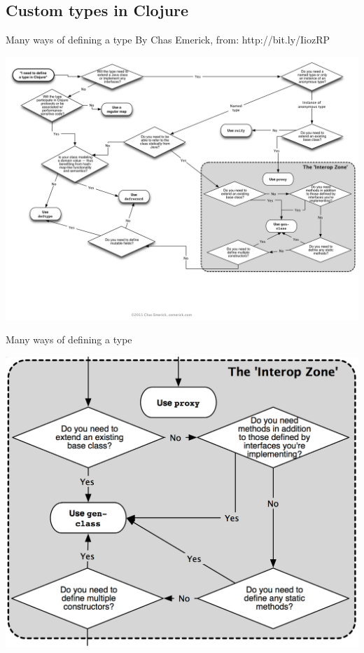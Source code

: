 \documentclass[xcolor=dvipsnames]{beamer}
\begin{document}
		\subsection{Custom types in Clojure}
		\begin{frame}{Many ways of defining a type}
		\tiny By Chas Emerick, from: http://bit.ly/IiozRP		
		\begin{center}
			\includegraphics[scale=.17]{choosingtypeforms.png}
		\end{center}
		\end{frame}
		
		\begin{frame}{Many ways of defining a type}
		\begin{center}
			\includegraphics[scale=.17]{choosingtypeformszoom.png}
		\end{center}
		\end{frame}
		
\end{document}
